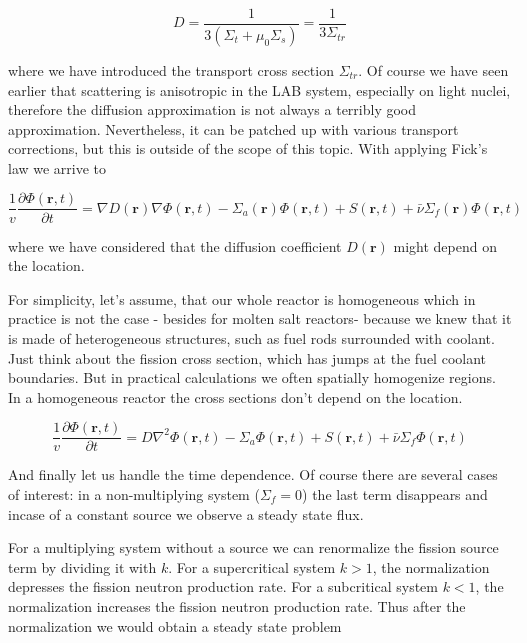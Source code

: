 \begin{equation}
D=\frac{1}{3(\Sigma_t+\mu_0\Sigma_s)}=\frac{1}{3\Sigma_{tr}}
\end{equation}

\noindent where we have introduced the transport cross section $\Sigma_{tr}$. Of course we have seen earlier that scattering is anisotropic in the LAB system, especially on light nuclei, therefore the diffusion approximation is not always a terribly good approximation. Nevertheless, it can be patched up with various transport corrections, but this is outside of the scope of this topic. With applying Fick's law we arrive to

\begin{equation}
\frac{1}{v}\frac{\partial\Phi(\mathbf{r},t)}{\partial t}=\nabla D(\mathbf{r})\nabla \Phi(\mathbf{r},t)-\Sigma_a(\mathbf{r})\Phi(\mathbf{r},t)+S(\mathbf{r},t) 
+\bar\nu\Sigma_f(\mathbf{r})\Phi(\mathbf{r},t)
\end{equation}

\noindent where we have considered that the diffusion coefficient $D(\mathbf{r})$ might depend on the location. 

For simplicity, let's assume, that our whole reactor is homogeneous which in practice is not the case - besides for molten salt reactors- because we knew that it is made of heterogeneous structures, such as fuel rods surrounded with coolant. Just think about the fission cross section, which has jumps at the fuel coolant boundaries. But in practical calculations we often spatially homogenize regions. In a homogeneous reactor the cross sections don't depend on the location. 

\begin{equation}
\frac{1}{v}\frac{\partial\Phi(\mathbf{r},t)}{\partial t}=D\nabla^2 \Phi(\mathbf{r},t)-\Sigma_a\Phi(\mathbf{r},t)+S(\mathbf{r},t) 
+\bar\nu\Sigma_f\Phi(\mathbf{r},t)
\end{equation}

And finally let us handle the time dependence. Of course there are several cases of interest: in a non-multiplying system ($\Sigma_f=0$) the last term disappears and incase of a constant source we observe a steady state flux. 

For a multiplying system without a source we can renormalize the fission source term by dividing it with $k$. For a supercritical system $k > 1$, the normalization depresses the fission neutron production rate. For a subcritical system $k < 1$, the normalization increases the fission neutron production rate. Thus after the normalization we would obtain a steady state problem

